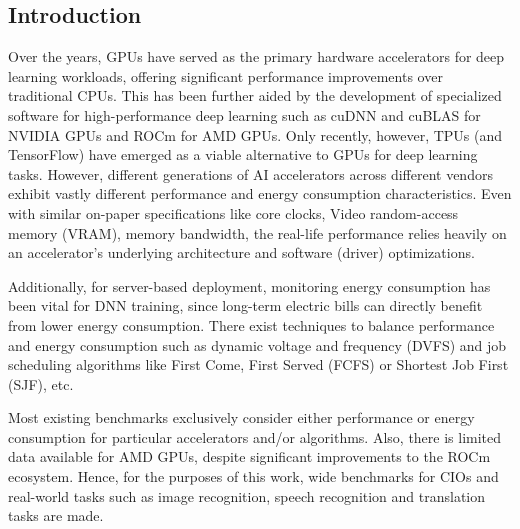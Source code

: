 \subsection{Introduction}
\label{subsec:introduction3}

Over the years, GPUs have served as the primary hardware accelerators for deep learning workloads,
offering significant performance improvements over traditional CPUs.
This has been further aided by the development of specialized software for high-performance deep learning such as cuDNN and cuBLAS for NVIDIA GPUs and ROCm for AMD GPUs.
Only recently, however, TPUs (and TensorFlow) have emerged as a viable alternative to GPUs for deep learning tasks.
However,
different generations of AI accelerators across different vendors exhibit vastly different performance and energy consumption characteristics.
Even with similar on-paper specifications like core clocks, Video random-access memory (VRAM), memory bandwidth,
the real-life performance relies heavily on an accelerator's underlying architecture and
software (driver) optimizations.

Additionally, for server-based deployment,
monitoring energy consumption has been vital for DNN training,
since long-term electric bills can directly benefit from lower energy consumption.
There exist techniques to balance performance and energy consumption such as dynamic voltage and frequency
(DVFS)\cite{b1} and job scheduling algorithms like First Come, First Served (FCFS) or Shortest Job First (SJF)\cite{b2}, etc.

Most existing benchmarks exclusively consider either performance or energy consumption for particular accelerators and/or algorithms.
Also, there is limited data available for AMD GPUs, despite significant improvements to the ROCm ecosystem.
Hence, for the purposes of this work,
wide benchmarks for CIOs and real-world tasks such as image recognition,
speech recognition and translation tasks are made.


